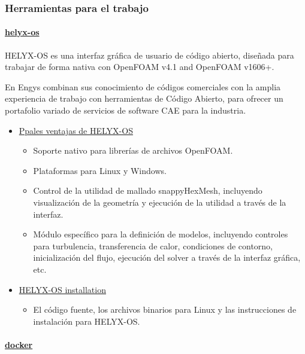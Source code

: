 \subsubsection{Herramientas para el trabajo}\label{header-n366}

\paragraph{\texorpdfstring{
\href{http://engys.com/es/services/training}{helyx-os}}{helyx-os}}\label{header-n368}

HELYX-OS es una interfaz gráfica de usuario de código abierto, diseñada
para trabajar de forma nativa con OpenFOAM v4.1 and OpenFOAM v1606+.

En Engys combinan sus conocimiento de códigos comerciales con la amplia
experiencia de trabajo con herramientas de Código Abierto, para ofrecer
un portafolio variado de servicios de software CAE para la industria.

\begin{itemize}
\item
  \href{http://engys.com/es/products/helyx-os}{Ppales ventajas de
  HELYX-OS}

  \begin{itemize}
  \item
    Soporte nativo para librerías de archivos OpenFOAM.
  \item
    Plataformas para Linux y Windows.
  \item
    Control de la utilidad de mallado snappyHexMesh, incluyendo
    visualización de la geometría y ejecución de la utilidad a través de
    la interfaz.
  \item
    Módulo específico para la definición de modelos, incluyendo
    controles para turbulencia, transferencia de calor, condiciones de
    contorno, inicialización del flujo, ejecución del solver a través de
    la interfaz gráfica, etc.
  \end{itemize}
\item
  \href{http://engys.github.io/HELYX-OS//installation/}{HELYX-OS
  installation}

  \begin{itemize}
  \item
    El código fuente, los archivos binarios para Linux y las
    instrucciones de instalación para HELYX-OS.
  \end{itemize}
\end{itemize}

\paragraph{\texorpdfstring{
\href{https://www.docker.com/}{docker}}{docker}}\label{header-n397}


